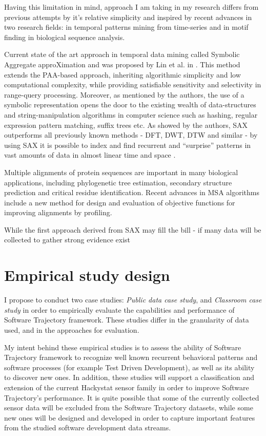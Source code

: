 \documentclass{sig-alternate}
\begin{document}
Having this limitation in mind, approach I am taking in my research differs from previous attempts by it's relative simplicity and inspired by recent advances in two research fields: in temporal patterns mining from time-series and in motif finding in biological sequence analysis. 

Current state of the art approach in temporal data mining called Symbolic Aggregate approXimation and was proposed by Lin et al. in \cite{citeulike:2821475}. This method extends the PAA-based approach, inheriting algorithmic simplicity and low computational complexity, while providing satisfiable sensitivity and selectivity in range-query processing. Moreover, as mentioned by the authors, the use of a symbolic representation opens the door to the existing wealth of data-structures and string-manipulation algorithms in computer science such as hashing, regular expression pattern matching, suffix trees etc. As showed by the authors, SAX outperforms all previously known methods - DFT, DWT, DTW and similar - by using SAX it is possible to index and find recurrent and ``surprise'' patterns in vast amounts of data in almost linear time and space \cite{citeulike:1630245} \cite{citeulike:3025877} \cite{citeulike:3000416}.

Multiple alignments of protein sequences are important in many biological applications, including phylogenetic tree estimation, secondary structure prediction and critical residue identification. Recent advances in MSA algorithms \cite{citeulike:692} include a new method for design and evaluation of objective functions for improving alignments by profiling.

While the first approach derived from SAX may fill the bill - if many data will be collected to gather strong evidence exist


\section{Empirical study design}
I propose to conduct two case studies: \textit{Public data case study}, and \textit{Classroom case study} in order to empirically evaluate the capabilities and performance of Software Trajectory framework. These studies differ in the granularity of data used, and in the approaches for evaluation. 

My intent behind these empirical studies is to assess the ability of Software Trajectory framework to recognize well known recurrent behavioral patterns and software processes (for example Test Driven Development), as well as its ability to discover new ones. In addition, these studies will support a classification and extension of the current Hackystat sensor family in order to improve Software Trajectory's performance. It is quite possible that some of the currently collected sensor data will be excluded from the Software Trajectory datasets, while some new ones will be designed and developed in order to capture important features from the studied software development data streams. 
\end{document}
